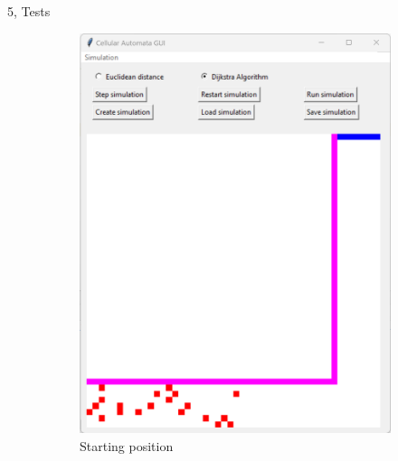 \documentclass[10pt,a4paper]{article}
\begin{document}
\begin{task}{5, Tests}
\begin{figure}[H]
     \centering
     \begin{subfigure}[b]{0.3\textwidth}
         \centering
         \includegraphics[width=\textwidth]{images/1-rimea6.png}
         \caption{Starting position}
         \label{fig:rimea6a}
     \end{subfigure}
     \begin{subfigure}[b]{0.3\textwidth}
         \centering

\end{subfigure}
\end{figure}
\end{task}
\end{document}
